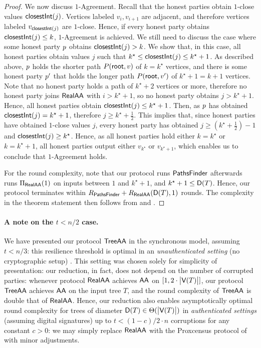 \begin{proof}
    We now discuss $1$-Agreement. Recall that the honest parties obtain $1$-close values $\textsf{closestInt}(j)$. Vertices labeled $v_i, v_{i + 1}$ are adjacent, and therefore vertices labeled $v_{\textsf{closestInt}(j)}$ are $1$-close. Hence, if every honest party obtains $\textsf{closestInt}(j) \leq k$, $1$-Agreement is achieved. We still need to discuss the case where some honest party $p$ obtains $\textsf{closestInt}(j) > k$. We show that, in this case, all honest parties obtain values $j$ such that $k^\star \leq \textsf{closestInt}(j) \leq k^\star + 1$.
    As described above, $p$ holds the shorter path $P(\textsf{root}, v)$ of $k = k^\star$ vertices, and there is some honest party $p'$ that holds the longer path $P(\textsf{root}, v')$ of $k^\star + 1 = k + 1$ vertices. Note that no honest party holds a path of $k^\star + 2$ vertices or more, therefore no honest party joins $\textsf{RealAA}$ with $i 
    > k^\star + 1$, so no honest party obtains $j > k^\star + 1$. Hence, all honest parties obtain $\textsf{closestInt}(j) \leq k^\star + 1$. Then, as $p$ has obtained $\textsf{closestInt}(j) = k^\star + 1$, therefore $j \geq k^\star + \frac{1}{2}$. This implies that, since honest parties have obtained $1$-close values $j$, every honest party has obtained $j \geq (k^\star + \frac{1}{2}) - 1$ and $\textsf{closestInt}(j) \geq k^\star$. Hence, as all honest parties hold either $k = k^\star$ or $k = k^\star + 1$, all honest parties output either $v_{k^\star}$ or $v_{k^\star + 1}$, which enables us to conclude that $1$-Agreement holds.

    For the round complexity, note that our protocol runs $\textsf{PathsFinder}$ afterwards runs $\Pi_{\textsf{RealAA}}(1)$ on inputs between $1$ and $k^\star + 1$, and $k^\star + 1 \leq \textsf{D}(T)$. Hence, our protocol terminates within $R_{\textsf{PathsFinder}} + R_{\textsf{RealAA}}(\textsf{D}(T), 1)$ rounds. The complexity in the theorem statement then follows from  and .
\end{proof}


\paragraph{A note on the $t < n / 2$ case.} We have presented our protocol $\textsf{TreeAA}$ in the synchronous model, assuming $t < n / 3$: this resilience threshold is optimal in an \emph{unauthenticated setting} (no cryptographic setup) \cite{JACM:DLPSW86}. This setting was chosen solely for simplicity of presentation: our reduction, in fact, does not depend on the number of corrupted parties: whenever protocol $\textsf{RealAA}$ achieves $\textsf{AA}$ on $[1, 2 \cdot \big\lvert\textsf{V}(T)\big\rvert]$, our protocol $\textsf{TreeAA}$ achieves $\textsf{AA}$ on the input tree $T$, and the round complexity of $\textsf{TreeAA}$ is double that of $\textsf{RealAA}$. Hence, our reduction also enables asymptotically optimal round complexity for trees of diameter $\textsf{D}(T) \in \Theta(\big\lvert\textsf{V}(T)\big\rvert)$ in \emph{authenticated settings} (assuming digital signatures) up to $t < (1 - c)/2 \cdot n$ corruptions for any constant $c > 0$: we may simply replace $\textsf{RealAA}$ with the Proxcensus protocol of \cite{EUROCRYPT:GhGoLi22} with minor adjustments.